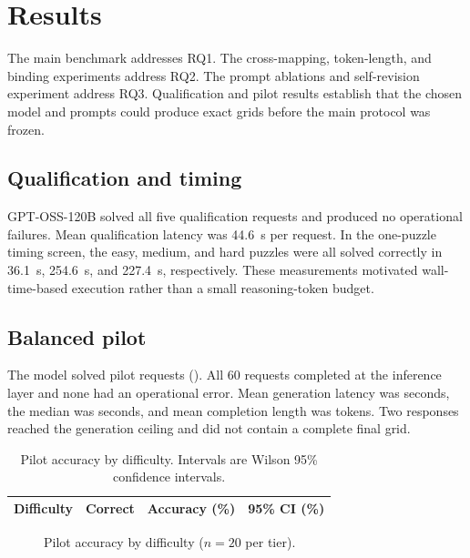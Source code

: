 \documentclass[11pt,a4paper]{article}
\begin{document}
\section{Results}
The main benchmark addresses RQ1. The cross-mapping, token-length, and binding experiments address RQ2. The prompt ablations and self-revision experiment address RQ3. Qualification and pilot results establish that the chosen model and prompts could produce exact grids before the main protocol was frozen.
\subsection{Qualification and timing}
GPT-OSS-120B solved all five qualification requests and produced no operational failures. Mean qualification latency was \SI{44.6}{\second} per request. In the one-puzzle timing screen, the easy, medium, and hard puzzles were all solved correctly in \SI{36.1}{\second}, \SI{254.6}{\second}, and \SI{227.4}{\second}, respectively. These measurements motivated wall-time-based execution rather than a small reasoning-token budget.

\subsection{Balanced pilot}
The model solved \PilotCorrect{} pilot requests (\PilotAccuracy{}). All 60 requests completed at the inference layer and none had an operational error. Mean generation latency was \PilotMeanLatency{} seconds, the median was \PilotMedianLatency{} seconds, and mean completion length was \PilotMeanTokens{} tokens. Two responses reached the generation ceiling and did not contain a complete final grid.

\begin{table}[H]
\centering
\caption{Pilot accuracy by difficulty. Intervals are Wilson 95\% confidence intervals.}
\label{tab:pilot-difficulty}
\begin{tabular}{lrrr}
\toprule
Difficulty & Correct & Accuracy (\%) & 95\% CI (\%) \\
\midrule
%
\end{tabular}
\end{table}

\begin{figure}[H]
\centering
{}
\caption{Pilot accuracy by difficulty ($n=20$ per tier).}
\label{fig:pilot-difficulty}
\end{figure}
\end{document}
